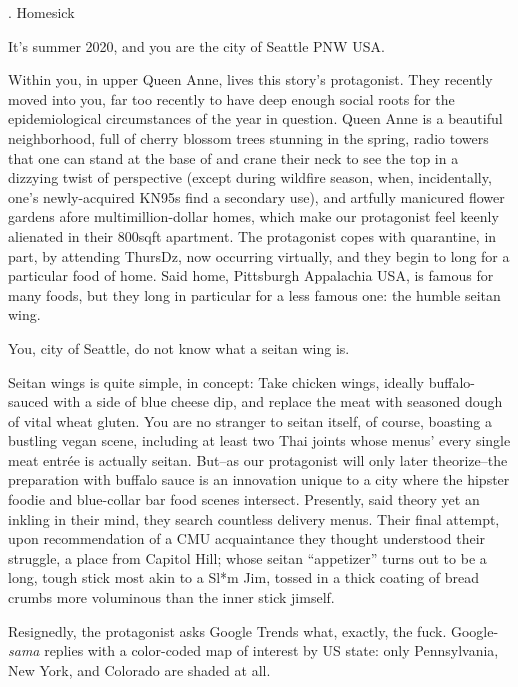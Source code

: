 \documentclass[12pt]{article}
\newcommand\chapter[2]{{\thispagestyle{empty} \Large \sc #1. \quad #2

\vspace{1.5em}}}
\begin{document}
\chapter{1}{Homesick}

It's summer 2020, and you are the city of Seattle PNW USA.

Within you, in upper Queen Anne, lives this story's protagonist.
They recently moved into you, far too recently to have deep enough social roots for the epidemiological circumstances of the year in question.
Queen Anne is a beautiful neighborhood,
full of cherry blossom trees stunning in the spring,
radio towers that one can stand at the base of and crane their neck to see the top in a dizzying twist of perspective
(except during wildfire season, when, incidentally, one's newly-acquired KN95s find a secondary use),
and artfully manicured flower gardens afore multimillion-dollar homes,
which make our protagonist feel keenly alienated in their 800sqft apartment.
The protagonist copes with quarantine, in part, by attending ThursDz, now occurring virtually,
and they begin to long for a particular food of home.
%
Said home, Pittsburgh Appalachia USA, is famous for many foods,
but they long in particular for a less famous one: the humble seitan wing.

You, city of Seattle, do not know what a seitan wing is.

Seitan wings is quite simple, in concept: Take chicken wings, ideally buffalo-sauced with a side of blue cheese dip, and replace the meat with seasoned dough of vital wheat gluten.
You are no stranger to seitan itself, of course, boasting a bustling vegan scene, including at least two Thai joints whose menus' every single meat entr\'ee is actually seitan.
But--as our protagonist will only later theorize--the preparation with buffalo sauce is an innovation unique to a city where the hipster foodie and blue-collar bar food scenes intersect.
Presently, said theory yet an inkling in their mind, they search countless delivery menus.
Their final attempt, upon recommendation of a CMU acquaintance they thought understood their struggle, a place from Capitol Hill;
whose seitan ``appetizer'' turns out to be a long, tough stick most akin to a Sl*m Jim, tossed in a thick coating of bread crumbs more voluminous than the inner stick jimself.

Resignedly, the protagonist asks Google Trends what, exactly, the fuck. Google-{\em sama} replies with a color-coded map of interest by US state: only Pennsylvania, New York, and Colorado are shaded at all.
\end{document}
